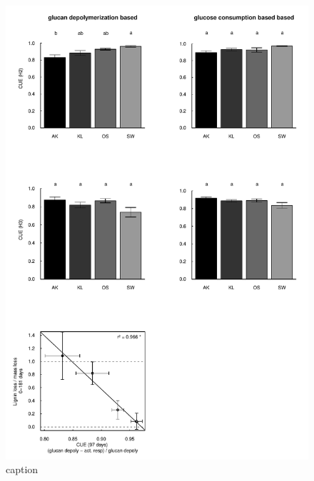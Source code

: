 \documentclass[10pt]{article}
\begin{document}
\newpage
\begin{figure}[h!]
\vspace*{2mm}
\begin{center}
\includegraphics{plosone-CUE}
\end{center}
\caption{caption}
\label{fig:cutlig}
\end{figure}     
     
\end{document}
